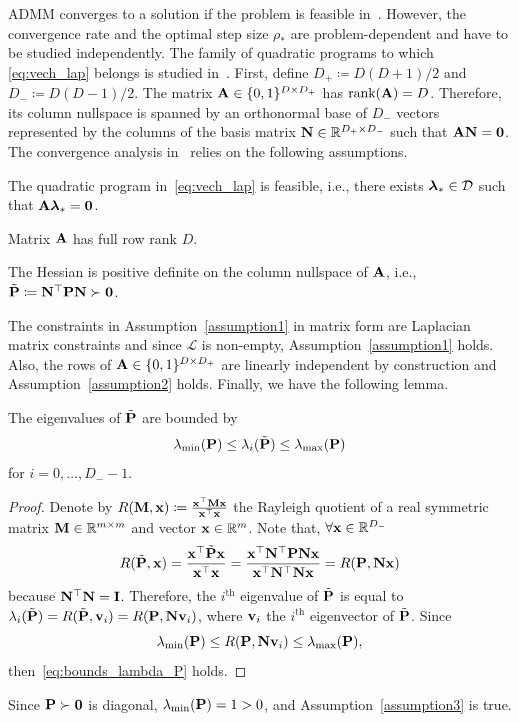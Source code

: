 ADMM converges to a solution if the problem is feasible in~\cite{admm}. However, the convergence rate and the optimal step size $\rho_\ast$ are problem-dependent and have to be studied independently. The family of quadratic programs to which \eqref{eq:vech_lap} belongs is studied in~\cite{optimal_step}. First, define $D_+\coloneqq D(D+1)/2$ and $D_-\coloneqq D(D-1)/2$. The matrix $\A\in\{0,1\}^{D\times D_+}$ has $\text{rank}(\A)=D$. Therefore, its column nullspace is spanned by an orthonormal base of $D_-$ vectors represented by the columns of the basis matrix $\N\in\R^{D_+\times D_-}$ such that $\A\N=\mathbf{0}$. The convergence analysis in~\cite{optimal_step} relies on the following assumptions.  
\begin{assumption}\label{assumption1}
	The quadratic program in~\eqref{eq:vech_lap} is feasible, i.e., there exists $\lh_\ast\in\mathcal{D}$ such that $\A\lh_\ast=\mathbf{0}$.
\end{assumption}
\begin{assumption}\label{assumption2}
	Matrix $\A$ has full row rank $D$.
\end{assumption}
\begin{assumption}\label{assumption3}
	The Hessian is positive definite on the column nullspace of $\A$, i.e., $\tilde\P\coloneqq\N^\top\P\N\succ\mathbf{0}$.
\end{assumption}
\noindent The constraints in Assumption~\ref{assumption1} in matrix form are Laplacian matrix constraints and since $\mathcal{L}$ is non-empty, Assumption~\ref{assumption1} holds. Also, the rows of $\A\in\{0,1\}^{D\times D_+}$ are linearly independent by construction and Assumption~\ref{assumption2} holds. Finally, we have the following lemma.
\begin{lemma}
	The eigenvalues of $\tilde\P$ are bounded by
	\begin{equation}\label{eq:bounds_lambda_P}
		\lambda_{\min}(\P) \leq \lambda_i(\tilde\P) \leq \lambda_{\max}(\P)
	\end{equation}
	for $i=0,\ldots,D_--1$.
	\begin{proof}
		Denote by $R(\M,\x) \coloneqq \frac{\x^\top\M\x}{\x^\top\x}$ the Rayleigh quotient of a real symmetric matrix $\M\in\R^{m\times m}$ and vector $\x\in\R^m$. Note that, $\forall \x\in\R^{D_-}$
		\begin{equation*}
			R(\tilde\P,\x) = \frac{\x^\top\tilde\P\x}{\x^\top\x} = \frac{\x^\top\N^\top\P\N\x}{\x^\top\N^\top\N\x} = R(\P,\N\x)
		\end{equation*}
		because $\N^\top\N=\I$. Therefore, the $i^\text{th}$ eigenvalue of $\tilde{\P}$ is equal to $\lambda_i(\tilde{\P})=R(\tilde\P,\v_i)=R(\P,\N\v_i)$, where $\v_i$ the $i^\text{th}$ eigenvector of $\tilde{\P}$. Since 
		\begin{equation*}
			\lambda_{\min}(\P) \leq R(\P,\N\v_i) \leq \lambda_{\max}(\P),
		\end{equation*}
		then~\eqref{eq:bounds_lambda_P} holds. 
	\end{proof}
\end{lemma}
\noindent Since $\P\succ\mathbf{0}$ is diagonal, $\lambda_{\min}(\P)=1>0$, and Assumption~\ref{assumption3} is true.

